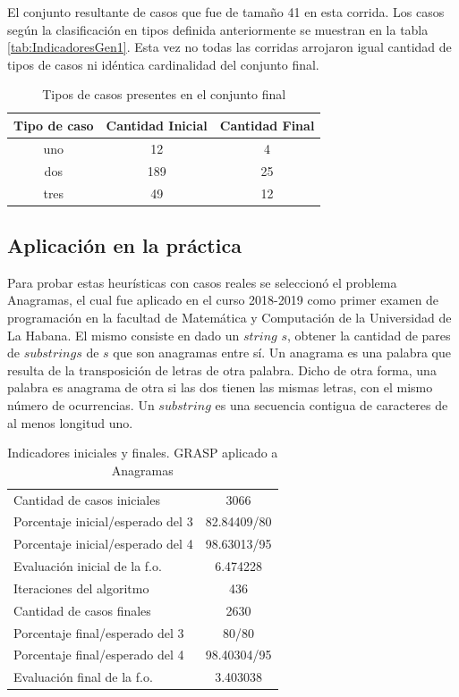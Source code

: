 \documentclass[a4paper,12pt]{book}
\begin{document}
	El conjunto resultante de casos que fue de tamaño 41 en esta corrida. Los casos según la clasificación en tipos definida anteriormente se muestran en la tabla \ref{tab:IndicadoresGen1}. Esta vez no todas las corridas arrojaron igual cantidad de tipos de casos ni idéntica cardinalidad del conjunto final.

	\begin{table}[h]
		\begin{center}
			\begin{tabular}{| c | c | c |} \hline
				Tipo de caso & Cantidad Inicial & Cantidad Final \\ \hline
				uno & 12 & 4 \\
				dos & 189 & 25 \\
				tres & 49 & 12 \\ \hline
			\end{tabular}
			\caption{Tipos de casos presentes en el conjunto final}
			\label{tab:TiposdecasosGen1}
		\end{center}
	\end{table}


	\subsection{Aplicación en la práctica}
		Para probar estas heurísticas con casos reales se seleccionó el problema Anagramas, el cual fue aplicado en el curso 2018-2019 como primer examen de programación en la facultad de Matemática y Computación de la Universidad de La Habana. El mismo consiste en dado un $string$ $s$, obtener la cantidad de pares de $substrings$ de $s$ que son anagramas entre sí. Un anagrama es una palabra que resulta de la transposición de letras de otra palabra. Dicho de otra forma, una palabra es anagrama de otra si las dos tienen las mismas letras, con el mismo número de ocurrencias. Un $substring$ es una secuencia contigua de caracteres de al menos longitud uno.
		
		\begin{table}[h]
			\begin{center}
				\begin{tabular}{| l | c |} \hline
					Cantidad de casos iniciales & 3066 \\
					Porcentaje inicial/esperado del 3 & 82.84409/80 \\
					Porcentaje inicial/esperado del 4 & 98.63013/95 \\
					Evaluación inicial de la f.o. & 6.474228 \\ \hline
					Iteraciones del algoritmo & 436 \\ \hline
					Cantidad de casos finales & 2630 \\
					Porcentaje final/esperado del 3 & 80/80 \\
					Porcentaje final/esperado del 4 & 98.40304/95 \\
					Evaluación final de la f.o. & 3.403038 \\ \hline
				\end{tabular}
				\caption{Indicadores iniciales y finales. GRASP aplicado a Anagramas}
				\label{tab:IndicadoresAnaGRASP1}
			\end{center}
		\end{table}
	
\end{document}
